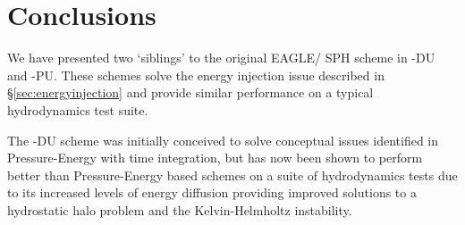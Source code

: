 \section{Conclusions}

We have presented two `siblings' to the original EAGLE/\anarchy{} 
SPH scheme in \anarchy{}-DU and \anarchy{}-PU. These schemes solve the
energy injection issue described in \S \ref{sec:energyinjection}
and provide similar performance on a typical hydrodynamics test suite.

The \anarchy{}-DU scheme was initially conceived to solve conceptual issues
identified in Pressure-Energy with time integration, but has now been
shown to perform better than Pressure-Energy based schemes on a suite of
hydrodynamics tests due to its increased levels of energy diffusion
providing improved solutions to a hydrostatic halo problem and the
Kelvin-Helmholtz instability.

